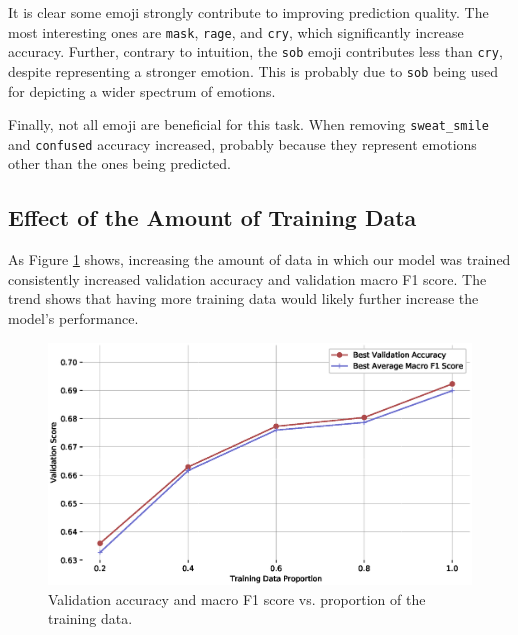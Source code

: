 \documentclass[11pt,a4paper]{article}
\begin{document}
It is clear some emoji strongly contribute to improving prediction quality. The
most interesting ones are \texttt{mask}, \texttt{rage}, and \texttt{cry}, which
significantly increase accuracy. Further, contrary to intuition, the
\texttt{sob} emoji contributes less than \texttt{cry}, despite representing a
stronger emotion. This is probably due to \texttt{sob} being used for depicting
a wider spectrum of emotions.

Finally, not all emoji are beneficial for this task. When removing
\texttt{sweat\_smile} and \texttt{confused} accuracy increased, probably because
they represent emotions other than the ones being predicted.




\subsection{Effect of the Amount of Training Data}

As Figure \ref{fig:data_amt_vs_acc} shows, increasing the amount of data in
which our model was trained consistently increased validation accuracy and
validation macro F1 score. The trend shows that having more training data would
likely further increase the model's performance.

\begin{figure}[!h]
    \centering
    \includegraphics[width=\columnwidth]{images/acc_vs_tdp_variation.eps}
    \caption{Validation accuracy and macro F1 score vs. proportion of the training data.}
    \label{fig:data_amt_vs_acc}
\end{figure}
\end{document}
